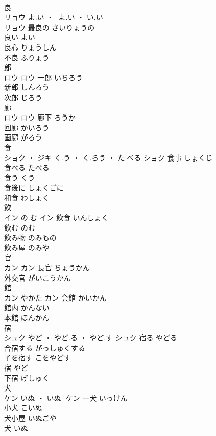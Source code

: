 \documentclass[8pt]{extreport}
\begin{document}
\begin{CJK}{UTF8}{min}
\\	良	
\\	リョウ	よ.い ・ -よ.い ・ い.い
\\	リョウ	最良の	さいりょうの	
\\	良い	よい	
\\	良心	りょうしん	
\\	不良	ふりょう	
\\	郎	
\\	ロウ		ロウ	一郎	いちろう	
\\	新郎	しんろう	
\\	次郎	じろう	
\\	廊	
\\	ロウ		ロウ	廊下	ろうか	
\\	回廊	かいろう	
\\	画廊	がろう	
\\	食	
\\	ショク ・ ジキ	く.う ・ く.らう ・ た.べる	ショク	食事	しょくじ	
\\	食べる	たべる	
\\	食う	くう	
\\	食後に	しょくごに	
\\	和食	わしょく	
\\	飲	
\\	イン	の.む	イン	飲食	いんしょく	
\\	飲む	のむ	
\\	飲み物	のみもの	
\\	飲み屋	のみや	
\\	官	
\\	カン		カン	長官	ちょうかん	
\\	外交官	がいこうかん	
\\	館	
\\	カン	やかた	カン													会館	かいかん	
\\	館内	かんない	
\\	本館	ほんかん	
\\	宿	
\\	シュク	やど ・ やど.る ・ やど.す	シュク	宿る	やどる	
\\	合宿する	がっしゅくする	
\\	子を宿す	こをやどす	
\\	宿	やど	
\\	下宿	げしゅく	
\\	犬	
\\	ケン	いぬ ・ いぬ-	ケン	一犬	いっけん	
\\	小犬	こいぬ	
\\	犬小屋	いぬごや	
\\	犬	いぬ	

\end{CJK}
\end{document}
